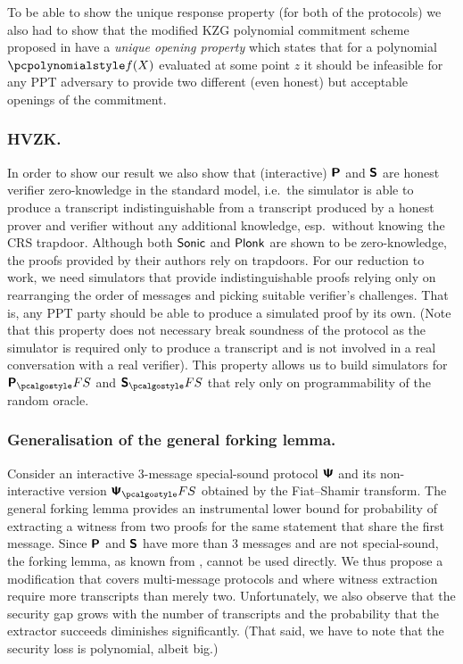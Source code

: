 \let\accentvec\vec \documentclass[runningheads,10pt]{llncs}
\begin{document}
To be able to show the unique response property (for both of the protocols) we
also had to show that the modified KZG polynomial commitment scheme \cite{AC:KatZavGol10}
proposed in \cite{EPRINT:GabWilCio19,CCS:MBKM19} have a \emph{unique opening
property} which states that for a polynomial $\p{f}(X)$ evaluated at some
point $z$ it should be infeasible for any PPT adversary to provide
two different (even honest) but acceptable openings of the commitment. 

\subsubsection{HVZK.}%
In order to show our result we also show that (interactive) $\bm{\mathsf{P}}$ and
$\bm{\mathsf{S}}$ are
honest verifier zero-knowledge in the standard model, i.e.~the simulator is
able to produce a transcript indistinguishable from a transcript produced by a
honest prover and verifier without any additional knowledge, esp.~without
knowing the CRS trapdoor.
Although both ${\textnormal{\textsf{Sonic}}}$ and $\textnormal{\textsf{Plonk}}$ are shown to be zero-knowledge, the proofs
provided by their authors rely on trapdoors. For our reduction to work,
we need simulators that provide indistinguishable proofs relying only on
rearranging the order of messages and picking suitable verifier's challenges. 
That is, any PPT
party should be able to produce a simulated proof by its own. (Note that this property
does not necessary break soundness of the protocol as the simulator is
required only to produce a transcript and is not involved in a real
conversation with a real verifier).
This property allows us to build simulators for $\plonkprotfs$ and
$\sonicprotfs$ that rely only on programmability of the random oracle.

\subsubsection{Generalisation of the general forking lemma.}
Consider an interactive $3$-message special-sound protocol $\bm{\mathsf{\Psi}}$ and its
non-interactive version $\ps_\fs$ obtained by the Fiat--Shamir
transform.  The general forking lemma provides an instrumental lower bound for
probability of extracting a witness from two proofs for the same statement
that share the first message. Since $\bm{\mathsf{P}}$ and $\bm{\mathsf{S}}$ have more
than $3$ messages and are not special-sound, the forking lemma, as known from
\cite{CCS:BelNev06}, cannot be used
directly. We thus propose a modification that covers multi-message protocols
and where witness extraction require more transcripts than merely two.
Unfortunately, we also observe that the security gap grows with the number of transcripts and the
probability that the
extractor succeeds diminishes significantly. (That said, we have to note that
the security loss is polynomial, albeit big.)
\end{document}
